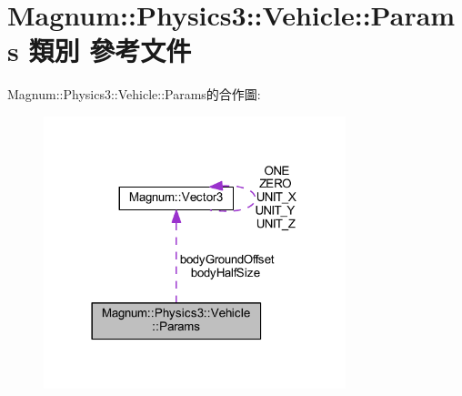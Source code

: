 \hypertarget{class_magnum_1_1_physics3_1_1_vehicle_1_1_params}{}\section{Magnum\+:\+:Physics3\+:\+:Vehicle\+:\+:Params 類別 參考文件}
\label{class_magnum_1_1_physics3_1_1_vehicle_1_1_params}


Magnum\+:\+:Physics3\+:\+:Vehicle\+:\+:Params的合作圖\+:\nopagebreak
\begin{figure}[H]
\begin{center}
\leavevmode
\includegraphics[width=249pt]{class_magnum_1_1_physics3_1_1_vehicle_1_1_params__coll__graph}
\end{center}
\end{figure}
